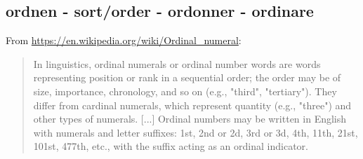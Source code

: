 \subsection{ordnen - sort/order - ordonner - ordinare}

From \url{https://en.wikipedia.org/wiki/Ordinal_numeral}:
\begin{quote}
In linguistics, ordinal numerals or ordinal number words are words representing position or rank in a sequential order; the order may be of size, importance, chronology, and so on (e.g., "third", "tertiary"). They differ from cardinal numerals, which represent quantity (e.g., "three") and other types of numerals. [...]
Ordinal numbers may be written in English with numerals and letter suffixes: 1st, 2nd or 2d, 3rd or 3d, 4th, 11th, 21st, 101st, 477th, etc., with the suffix acting as an ordinal indicator.
\end{quote}
